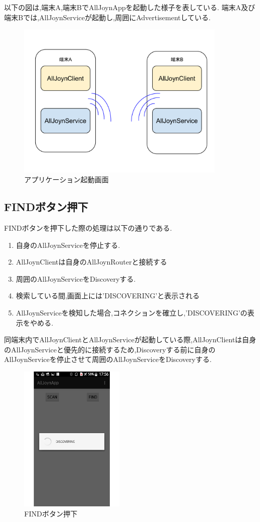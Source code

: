 以下の図は,端末A,端末BでAllJoynAppを起動した様子を表している.
端末A及び端末Bでは,AllJoynServiceが起動し,周囲にAdvertisementしている.

\begin{figure}[htbp]
\centering
\includegraphics[width=10cm]{fig/appstart.pdf}
\caption{アプリケーション起動画面}
\end{figure}



\subsection{FINDボタン押下}
FINDボタンを押下した際の処理は以下の通りである.

\begin{enumerate}
\item 自身のAllJoynServiceを停止する.
\item AllJoynClientは自身のAllJoynRouterと接続する
\item 周囲のAllJoynServiceをDiscoveryする.
\item 検索している間,画面上には'DISCOVERING'と表示される
\item AllJoynServiceを検知した場合,コネクションを確立し,'DISCOVERING'の表示をやめる.
\end{enumerate}

同端末内でAllJoynClientとAllJoynServiceが起動している際,AllJoynClientは自身のAllJoynServiceと優先的に接続するため,Discoveryする前に自身のAllJoynServiceを停止させて周囲のAllJoynServiceをDiscoveryする.

\begin{figure}[htbp]
\centering
\includegraphics[width=5cm]{fig/screen2.pdf}
\caption{FINDボタン押下}
\end{figure}

